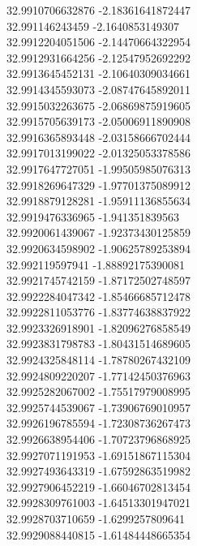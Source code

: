 {32.9910706632876	-2.18361641872447\\
32.991146243459	-2.1640853149307\\
32.9912204051506	-2.14470664322954\\
32.9912931664256	-2.12547952692292\\
32.9913645452131	-2.10640309034661\\
32.9914345593073	-2.08747645892011\\
32.9915032263675	-2.06869875919605\\
32.9915705639173	-2.05006911890908\\
32.9916365893448	-2.03158666702444\\
32.9917013199022	-2.01325053378586\\
32.9917647727051	-1.99505985076313\\
32.9918269647329	-1.97701375089912\\
32.9918879128281	-1.95911136855634\\
32.9919476336965	-1.941351839563\\
32.9920061439067	-1.92373430125859\\
32.9920634598902	-1.90625789253894\\
32.992119597941	-1.88892175390081\\
32.9921745742159	-1.87172502748597\\
32.9922284047342	-1.85466685712478\\
32.9922811053776	-1.83774638837922\\
32.9923326918901	-1.82096276858549\\
32.9923831798783	-1.80431514689605\\
32.9924325848114	-1.78780267432109\\
32.9924809220207	-1.77142450376963\\
32.9925282067002	-1.75517979008995\\
32.9925744539067	-1.73906769010957\\
32.9926196785594	-1.72308736267473\\
32.9926638954406	-1.70723796868925\\
32.9927071191953	-1.69151867115304\\
32.9927493643319	-1.67592863519982\\
32.9927906452219	-1.66046702813454\\
32.9928309761003	-1.64513301947021\\
32.9928703710659	-1.6299257809641\\
32.9929088440815	-1.61484448665354\\
}
